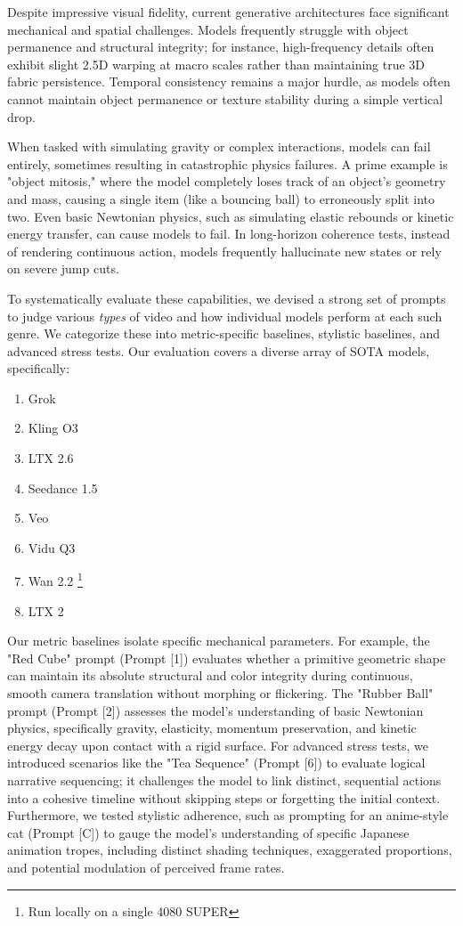 \documentclass[sigconf]{acmart}
\begin{document}
Despite impressive visual fidelity, current generative architectures face significant mechanical and spatial challenges. Models frequently struggle with object permanence and structural integrity; for instance, high-frequency details often exhibit slight 2.5D warping at macro scales rather than maintaining true 3D fabric persistence. Temporal consistency remains a major hurdle, as models often cannot maintain object permanence or texture stability during a simple vertical drop.

When tasked with simulating gravity or complex interactions, models can fail entirely, sometimes resulting in catastrophic physics failures. A prime example is "object mitosis," where the model completely loses track of an object's geometry and mass, causing a single item (like a bouncing ball) to erroneously split into two. Even basic Newtonian physics, such as simulating elastic rebounds or kinetic energy transfer, can cause models to fail. In long-horizon coherence tests, instead of rendering continuous action, models frequently hallucinate new states or rely on severe jump cuts.

To systematically evaluate these capabilities, we devised a strong set of prompts to judge various \emph{types} of video and how individual models perform at each such genre. We categorize these into metric-specific baselines, stylistic baselines, and advanced stress tests. Our evaluation covers a diverse array of SOTA models, specifically:
\begin{enumerate}
    \item Grok
    \item Kling O3
    \item LTX 2.6
    \item Seedance 1.5
    \item Veo
    \item Vidu Q3
    \item Wan 2.2 \footnote[1]{Run locally on a single 4080 SUPER}
    \item LTX 2 \footnotemark[1]
\end{enumerate}

Our metric baselines isolate specific mechanical parameters. For example, the "Red Cube" prompt (Prompt [1]) evaluates whether a primitive geometric shape can maintain its absolute structural and color integrity during continuous, smooth camera translation without morphing or flickering. The "Rubber Ball" prompt (Prompt [2]) assesses the model's understanding of basic Newtonian physics, specifically gravity, elasticity, momentum preservation, and kinetic energy decay upon contact with a rigid surface. For advanced stress tests, we introduced scenarios like the "Tea Sequence" (Prompt [6]) to evaluate logical narrative sequencing; it challenges the model to link distinct, sequential actions into a cohesive timeline without skipping steps or forgetting the initial context. Furthermore, we tested stylistic adherence, such as prompting for an anime-style cat (Prompt [C]) to gauge the model's understanding of specific Japanese animation tropes, including distinct shading techniques, exaggerated proportions, and potential modulation of perceived frame rates.
\end{document}
